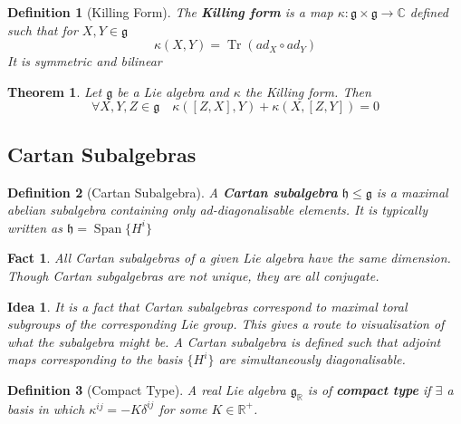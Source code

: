 \documentclass{article}
\newtheorem{theorem}{Theorem}[section]
\newtheorem{definition}{Definition}[subsection]
\newtheorem{fact}{Fact}[subsection]
\newtheorem*{idea}{Idea}
\DeclareMathOperator{\spn}{Span}
\DeclareMathOperator{\tr}{Tr}
\newcommand{\bam}[1]{\textbf{#1}}
\newcommand{\mf}[1]{\mathfrak{#1}}
\newcommand{\mbb}[1]{\mathbb{#1}}
\newcommand{\comm}[2][]{\left[ #1, #2 \right]}
\begin{document}
\begin{definition}[Killing Form]
The \bam{Killing form} is a map $\kappa:\mf{g}\times\mf{g}\to\mbb{C}$ defined such that for $X,Y\in\mf{g}$
\[
\kappa\left(X,Y\right)=\tr\left(ad_X \circ ad_Y\right)
\]
It is symmetric and bilinear 
\end{definition}

\begin{theorem}
Let $\mf{g}$ be a Lie algebra and $\kappa$ the Killing form. Then
\[
\forall X,Y,Z\in\mf{g} \quad \kappa\left(\comm[Z]{X},Y\right)+\kappa\left(X,\comm[Z]{Y}\right)=0
\]
\end{theorem}

\subsection{Cartan Subalgebras}

\begin{definition}[Cartan Subalgebra]
A \bam{Cartan subalgebra} $\mf{h}\leq\mf{g}$ is a maximal abelian subalgebra containing only ad-diagonalisable elements. It is typically written as $\mf{h}=\spn\lbrace H^i \rbrace$
\end{definition}

\begin{fact}
All Cartan subalgebras of a given Lie algebra have the same dimension. Though Cartan subgalgebras are not unique, they are all conjugate. 
\end{fact}

\begin{idea}
It is a fact that Cartan subalgebras correspond to maximal toral subgroups of the corresponding Lie group. This gives a route to visualisation of what the subalgebra might be. A Cartan subalgebra is defined such that adjoint maps corresponding to the basis $\lbrace H^i \rbrace$ are simultaneously diagonalisable. 
\end{idea}

\begin{definition}[Compact Type]
A real Lie algebra $\mf{g}_\mathbb{R}$ is of \bam{compact type} if $\exists$ a basis in which $\kappa^{ij}=-K\delta^{ij}$ for some $K\in\mathbb{R}^{+}$.
\end{definition}



\end{document}
